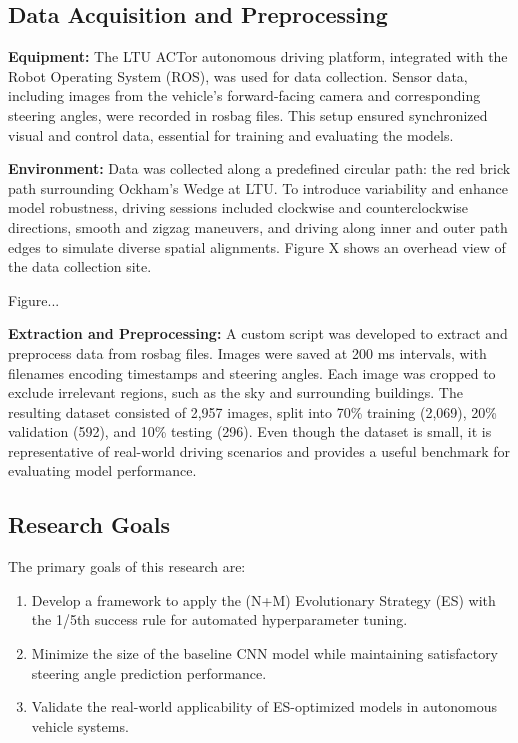 \documentclass[conference]{IEEEtran}
\begin{document}
\subsection{Data Acquisition and Preprocessing}

\textbf{Equipment:} The LTU ACTor autonomous driving platform, integrated with the Robot Operating System (ROS), was used for data collection. Sensor data, including images from the vehicle's forward-facing camera and corresponding steering angles, were recorded in rosbag files. This setup ensured synchronized visual and control data, essential for training and evaluating the models.

\textbf{Environment:} Data was collected along a predefined circular path: the red brick path surrounding Ockham's Wedge at LTU. To introduce variability and enhance model robustness, driving sessions included clockwise and counterclockwise directions, smooth and zigzag maneuvers, and driving along inner and outer path edges to simulate diverse spatial alignments.  Figure X shows an overhead view of the data collection site.

Figure...

\textbf{Extraction and Preprocessing:} A custom script was developed to extract and preprocess data from rosbag files. Images were saved at 200 ms intervals, with filenames encoding timestamps and steering angles. Each image was cropped to exclude irrelevant regions, such as the sky and surrounding buildings. The resulting dataset consisted of 2,957 images, split into 70\% training (2,069), 20\% validation (592), and 10\% testing (296). Even though the dataset is small, it is representative of real-world driving scenarios and provides a useful benchmark for evaluating model performance.

\subsection{Research Goals}

The primary goals of this research are:
\begin{enumerate}
    \item Develop a framework to apply the (N+M) Evolutionary Strategy (ES) with the 1/5th success rule for automated hyperparameter tuning.
    \item Minimize the size of the baseline CNN model while maintaining satisfactory steering angle prediction performance.
    \item Validate the real-world applicability of ES-optimized models in autonomous vehicle systems.
\end{enumerate}
\end{document}
